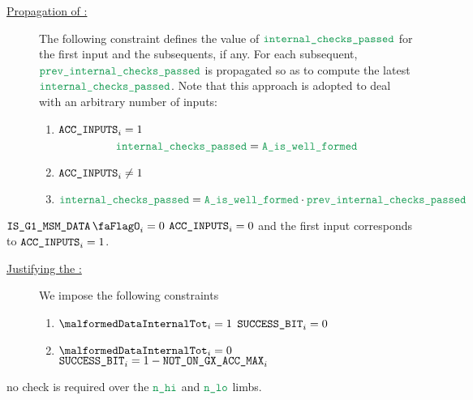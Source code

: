 \begin{description}
    \item[\underline{Propagation of \locInternalChecksPassed:}]
          The following constraint defines the value of $\locInternalChecksPassed$ for the first input and the subsequents, if any.
          For each subsequent, $\locPreviousInternalChecksPassed$ is propagated so as to compute the latest $\locInternalChecksPassed$.
          Note that this approach is adopted to deal with an arbitrary number of inputs:
          \begin{enumerate}
              \item \If $\texttt{ACC\_INPUTS}_{i} = 1$ \Then
                    \[
                        \locInternalChecksPassed = \locAIsWellFormed 
                    \]
              \item \If $\texttt{ACC\_INPUTS}_{i} \neq 1$ \Then
                    \item $\locInternalChecksPassed = \locAIsWellFormed \cdot \locPreviousInternalChecksPassed$
          \end{enumerate}
\end{description}
\saNote{} \If $\isBlsGOneMsmData_{i} = 0$ \Then $\texttt{ACC\_INPUTS}_{i} = 0$ and the first input corresponds to $\texttt{ACC\_INPUTS}_{i} = 1$.
\begin{description}
    \item[\underline{Justifying the \blsSuccessBit{}:}]
          We impose the following constraints
          \begin{enumerate}
              \item \If $\malformedDataInternalTot _{i} = 1$ \Then $\texttt{SUCCESS\_BIT} _{i} = 0$
              \item \If $\malformedDataInternalTot _{i} = 0$ \Then $\texttt{SUCCESS\_BIT}_{i} = 1 - \texttt{NOT\_ON\_GX\_ACC\_MAX} _{i}$
          \end{enumerate}
\end{description}

\saNote{} no check is required over the $\locNHi$ and $\locNLo$ limbs.
